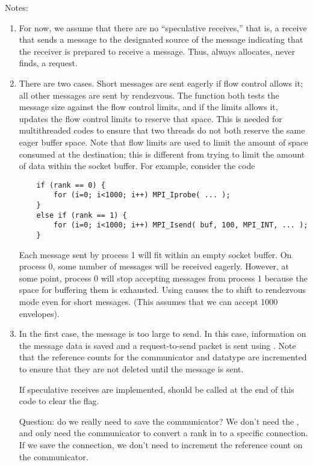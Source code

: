 Notes:
\begin{enumerate}
\item For now, we assume that there are no ``speculative receives,'' that is,
  a receive that sends a message to the designated source of the message
  indicating that the receiver is prepared to receive a message.  Thus, 
   always allocates, never finds, a request.

\item There are two cases.  Short messages are sent eagerly if flow control
  allows it; all other messages are sent by rendezvous.  
  The function  both tests the message size against
  the flow control limits, and if the limits allows it, updates the flow
  control limits to reserve that space.  This is needed for multithreaded
  codes to ensure that two threads do not both reserve the same eager buffer
  space.  Note that flow limits are used to limit the amount of space consumed
  at the destination; this is different from trying to limit the amount of
  data within the socket buffer.  For example, consider the code
\begin{verbatim}
    if (rank == 0) {
        for (i=0; i<1000; i++) MPI_Iprobe( ... );
    } 
    else if (rank == 1) {
        for (i=0; i<1000; i++) MPI_Isend( buf, 100, MPI_INT, ... );
    }
\end{verbatim}
  Each message sent by process 1 will fit within an empty socket buffer.  
  On process 0, some number of messages will be received eagerly.  However, at
  some point, process 0 will stop accepting messages from process 1 because
  the space for buffering them is exhausted.  Using 
  causes the  to shift to rendezvous mode even for short
  messages.  (This assumes that we can accept 1000 envelopes).

\item In the first case, the message is too large to send.  In this case,
  information on the message data is saved and a request-to-send packet is
  sent using .  Note that the reference counts for the
  communicator and datatype are incremented to ensure that they are not
  deleted until the message is sent.

  If speculative receives are implemented, 
  should be called at the end of this code to clear the  flag.

  Question: do we really need to save the communicator?  We don't need the
  , and only need the communicator to convert a rank in to a
  specific connection.  If we save the connection, we don't need to increment
  the reference count on the communicator.


\end{enumerate}
